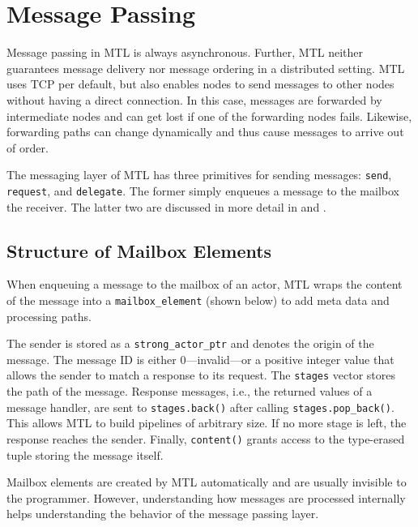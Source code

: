 \section{Message Passing}
\label{message-passing}

Message passing in MTL is always asynchronous. Further, MTL neither guarantees
message delivery nor message ordering in a distributed setting. MTL uses TCP
per default, but also enables nodes to send messages to other nodes without
having a direct connection.  In this case, messages are forwarded by
intermediate nodes and can get lost if one of the forwarding nodes fails.
Likewise, forwarding paths can change dynamically and thus cause messages to
arrive out of order.

The messaging layer of MTL has three primitives for sending messages:
\lstinline^send^, \lstinline^request^, and \lstinline^delegate^. The former
simply enqueues a message to the mailbox the receiver. The latter two are
discussed in more detail in  and .

\subsection{Structure of Mailbox Elements}
\label{mailbox-element}

When enqueuing a message to the mailbox of an actor, MTL wraps the content of
the message into a \lstinline^mailbox_element^ (shown below) to add meta data
and processing paths.


The sender is stored as a \lstinline^strong_actor_ptr^  and
denotes the origin of the message. The message ID is either 0---invalid---or a
positive integer value that allows the sender to match a response to its
request. The \lstinline^stages^ vector stores the path of the message. Response
messages, i.e., the returned values of a message handler, are sent to
\lstinline^stages.back()^ after calling \lstinline^stages.pop_back()^. This
allows MTL to build pipelines of arbitrary size. If no more stage is left, the
response reaches the sender. Finally, \lstinline^content()^ grants access to
the type-erased tuple storing the message itself.

Mailbox elements are created by MTL automatically and are usually invisible to
the programmer. However, understanding how messages are processed internally
helps understanding the behavior of the message passing layer.

